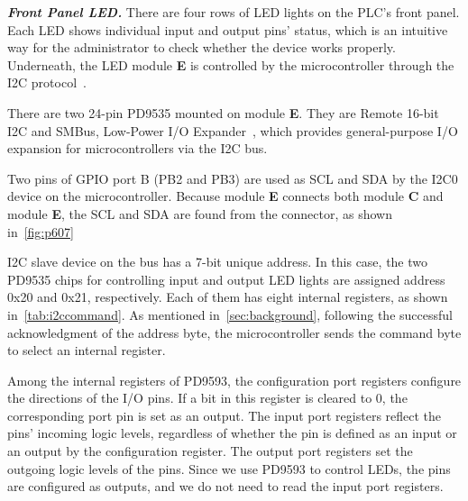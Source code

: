 \textbf{\textit{Front Panel LED.}} There are four rows of LED lights on the PLC's front panel. Each LED shows individual input and output pins' status, which is an intuitive way for the administrator to check whether the device works properly. Underneath, the LED module \textbf{E} is controlled by the microcontroller through the I2C protocol~\cite{semiconductors2000i2c}. 

There are two 24-pin PD9535 mounted on module \textbf{E}. They are Remote 16-bit I2C and SMBus, Low-Power I/O Expander~\cite{pd9535}, which provides general-purpose I/O expansion for microcontrollers via the I2C bus. 

Two pins of GPIO port B (PB2 and PB3) are used as SCL and SDA by the I2C0 device on the microcontroller. Because module \textbf{E} connects both module \textbf{C} and module \textbf{E}, the SCL and SDA are found from the connector, as shown in~\autoref{fig:p607}


I2C slave device on the bus has a 7-bit unique address.  In this case, the two PD9535 chips for controlling input and output LED lights are assigned address 0x20 and 0x21, respectively.  Each of them has eight internal registers, as shown in~\autoref{tab:i2ccommand}. As mentioned in~\autoref{sec:background}, following the successful acknowledgment of the address byte, the microcontroller sends the command byte to select an internal register. 

Among the internal registers of PD9593, the configuration port registers configure the directions of the I/O pins. If a bit in this register is cleared to 0, the corresponding port pin is set as an output. The input port registers reflect the pins' incoming logic levels, regardless of whether the pin is defined as an input or an output by the configuration register. The output port registers set the outgoing logic levels of the pins. Since we use PD9593 to control LEDs, the pins are configured as outputs, and we do not need to read the input port registers. 

